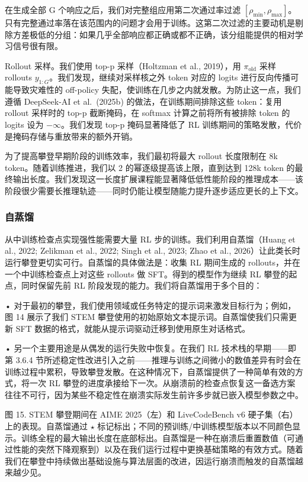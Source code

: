 \documentclass[
  10
]{article}
\begin{document}
在生成全部 G 个响应之后，我们对完整组应用第二次通过率过滤 \([ \rho _ { \mathrm { m i n } } , \rho _ { \mathrm { m a x } } ]\)。只有完整通过率落在该范围内的问题才会用于训练。这第二次过滤的主要动机是剔除方差极低的分组：如果几乎全部响应都正确或都不正确，该分组能提供的相对学习信号很有限。

Rollout 采样。我们使用 top-p 采样（Holtzman et al., 2019），用 \(\pi _ { \mathrm { o l d } }\) 采样 rollouts \(y _ { 1 : G }\)。我们发现，继续对采样核之外 token 对应的 logits 进行反向传播可能导致灾难性的 off-policy 失配，使训练在几步之内就发散。为防止这一点，我们遵循 DeepSeek-AI et al.~(2025b) 的做法，在训练期间排除这些 token：复用 rollout 采样时的 top-p 截断掩码，在 softmax 计算之前将所有被排除 token 的 logits 设为 $-\infty$。我们发现 top-p 掩码显著降低了 RL 训练期间的策略发散，代价是掩码存储与重放带来的额外开销。

为了提高攀登早期阶段的训练效率，我们最初将最大 rollout 长度限制在 8k token。随着训练推进，我们以 2 的幂逐级提高该上限，直到达到 128k token 的最终输出长度。我们发现这一长度扩展课程能显著降低低性能阶段的推理成本——该阶段很少需要长推理轨迹——同时仍能让模型随能力提升逐步适应更长的上下文。

\subsubsection{自蒸馏}\label{selfdistillation}

从中训练检查点实现强性能需要大量 RL 步的训练。我们利用自蒸馏（Huang et al., 2022; Zelikman et al., 2022; Singh et al., 2023; Zhao et al., 2026）让此类长时运行攀登更切实可行。自蒸馏的具体做法是：收集 RL 期间生成的 rollouts，并在一个中训练检查点上对这些 rollouts 做 SFT。得到的模型作为继续 RL 攀登的起点，同时保留先前 RL 阶段发现的能力。我们将自蒸馏用于多个目的：

• 对于最初的攀登，我们使用领域或任务特定的提示词来激发目标行为；例如，图 14 展示了我们 STEM 攀登使用的初始原始文本提示词。自蒸馏使我们只需更新 SFT 数据的格式，就能从提示词驱动迁移到使用原生对话格式。

• 另一个主要用途是从偶发的运行失败中恢复。在我们 RL 技术栈的早期——即第 3.6.4 节所述稳定性改进引入之前——推理与训练之间微小的数值差异有时会在训练过程中累积，导致攀登发散。在这种情况下，自蒸馏提供了一种简单有效的方式，将一次 RL 攀登的进度承接给下一次。从崩溃前的检查点恢复这一备选方案往往不可行，因为某些不稳定性在崩溃实际发生前许多步就已嵌入模型参数之中。



图 15. STEM 攀登期间在 AIME 2025（左）和 LiveCodeBench v6 硬子集（右）上的表现。自蒸馏通过 $\star$ 标记标出；不同的预训练/中训练模型版本以不同颜色显示。训练全程的最大输出长度在底部标出。自蒸馏是一种在崩溃后重置数值（可通过性能的突然下降观察到）以及在我们运行过程中更换基础策略的有效方式。随着我们在攀登中持续做出基础设施与算法层面的改进，因运行崩溃而触发的自蒸馏越来越少见。
\end{document}
